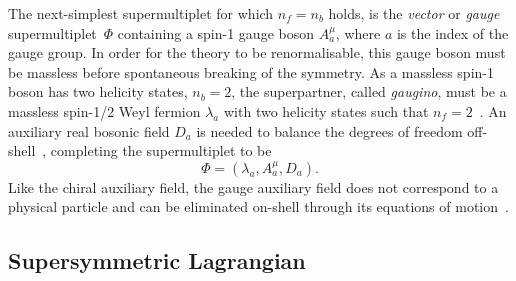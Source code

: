 The next-simplest supermultiplet for which $n_f = n_b$ holds, is the \textit{vector} or \textit{gauge} supermultiplet~$\Phi$ containing a spin-1 gauge boson $A^\mu_a$, where $a$ is the index of the gauge group. In order for the theory to be renormalisable, this gauge boson must be massless before spontaneous breaking of the symmetry.
As a massless spin-1 boson has two helicity states, \ie $n_b = 2$, the superpartner, called \textit{gaugino}, must be a massless spin-1/2 Weyl fermion $\lambda_a$ with two helicity states such that $n_f = 2$~\cite{Martin:1997ns}. An auxiliary real bosonic field $D_a$ is needed to balance the degrees of freedom off-shell~\cite{Bustamante:2009us}, completing the supermultiplet to be
\begin{equation}
	\Phi = (\lambda_a,A^\mu_a,D_a).
\end{equation}
 Like the chiral auxiliary field, the gauge auxiliary field does not correspond to a physical particle and can be eliminated on-shell through its equations of motion~\cite{Martin:1997ns}.

\subsection{Supersymmetric Lagrangian}\label{sec:susy_lagrangian}


